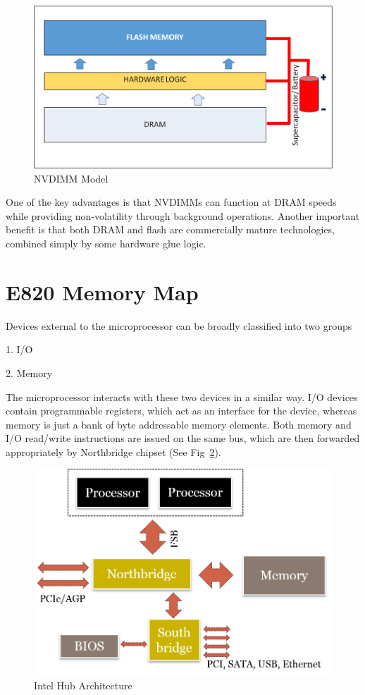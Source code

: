 \begin{figure}[H]
  \centering
  \includegraphics[scale=0.6]{figures/NVDIMM_Stack.png}
  \caption{NVDIMM Model}
  \label{fig:nvdimm}
\end{figure}
One of the key advantages is that NVDIMMs can function at DRAM speeds while providing non-volatility through background operations. Another important benefit is that both DRAM and flash are commercially mature technologies, combined simply by some hardware glue logic. 

\section{E820 Memory Map}

Devices external to the microprocessor can be broadly classified into two groups

1. I/O

2. Memory

The microprocessor interacts with these two devices in a similar way. I/O devices contain programmable registers, which act as an interface for the device, whereas memory is just a bank of byte addressable memory elements. Both memory and I/O read/write instructions are issued on the same bus, which are then forwarded appropriately by Northbridge chipset (See Fig~\ref{fig:intel_arch}). 

\setlength{\belowcaptionskip}{-10pt}

\begin{figure}[H]
  \centering
  \includegraphics[scale=0.6]{figures/intelhubarchi.png}
  \caption{Intel Hub Architecture}
  \label{fig:intel_arch}
\end{figure}

